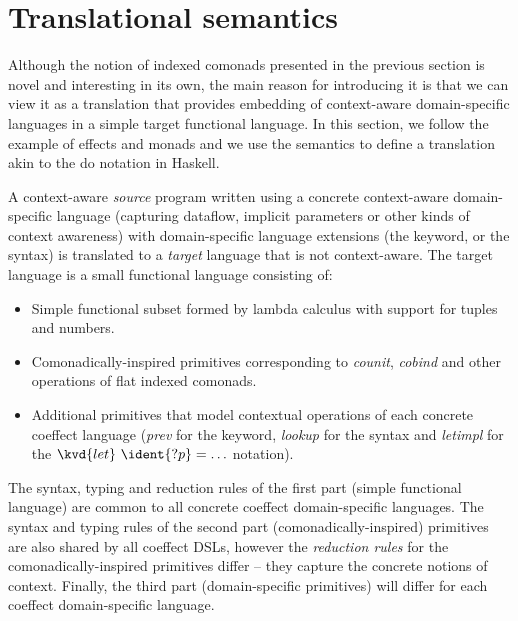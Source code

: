 
\section{Translational semantics}
\label{sec:semantics-translation}

Although the notion of indexed comonads presented in the previous section is novel and interesting
in its own, the main reason for introducing it is that we can view it as a translation that provides
embedding of context-aware domain-specific languages in a simple target functional language.
In this section, we follow the example of effects and monads and we use the semantics to define a
translation akin to the do notation in Haskell.

A context-aware \emph{source} program written using a concrete context-aware domain-specific
language (capturing dataflow, implicit parameters or other kinds of context awareness) with
domain-specific language extensions (the  keyword, or the  syntax)
is translated to a \emph{target} language that is not context-aware. The target language is
a small functional language consisting of:
%
\begin{itemize}
  \item Simple functional subset formed by lambda calculus with support for tuples and numbers.
  \item Comonadically-inspired primitives corresponding to \emph{counit}, \emph{cobind} and
    other operations of flat indexed comonads.
  \item Additional primitives that model contextual operations of each concrete coeffect language
    (\emph{prev} for the  keyword, \emph{lookup} for the  syntax and
    \emph{letimpl} for the $\kvd{let}~\ident{?p}=\ldots$ notation).
\end{itemize}
%
The syntax, typing and reduction rules of the first part (simple functional language) are common to
all concrete coeffect domain-specific languages. The syntax and typing rules of the second part
(comonadically-inspired) primitives are also shared by all coeffect DSLs, however the \emph{reduction
rules} for the comonadically-inspired primitives differ -- they capture the concrete notions of
context. Finally, the third part (domain-specific primitives) will differ for each coeffect
domain-specific language.


